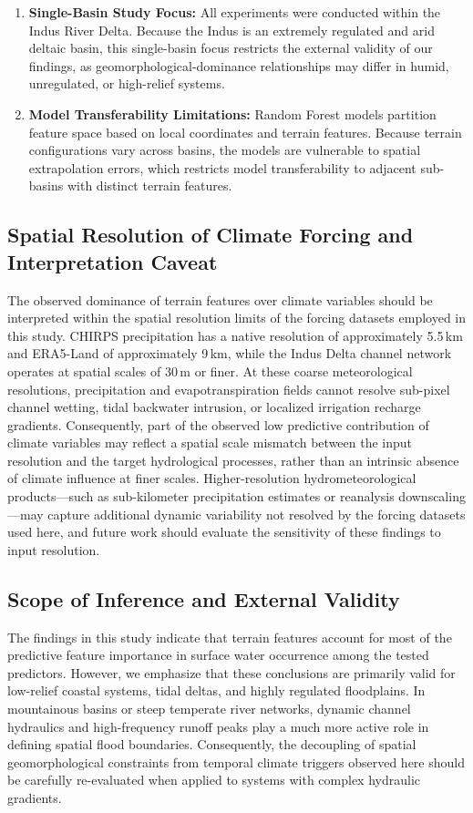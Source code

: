 \documentclass[12pt, a4paper]{article}
\begin{document}
\begin{enumerate}
    \item \textbf{Single-Basin Study Focus:} All experiments were conducted within the Indus River Delta. Because the Indus is an extremely regulated and arid deltaic basin, this single-basin focus restricts the external validity of our findings, as geomorphological-dominance relationships may differ in humid, unregulated, or high-relief systems.
    \item \textbf{Model Transferability Limitations:} Random Forest models partition feature space based on local coordinates and terrain features. Because terrain configurations vary across basins, the models are vulnerable to spatial extrapolation errors, which restricts model transferability to adjacent sub-basins with distinct terrain features.
\end{enumerate}

\subsection{Spatial Resolution of Climate Forcing and Interpretation Caveat}
The observed dominance of terrain features over climate variables should be interpreted within the spatial resolution limits of the forcing datasets employed in this study. CHIRPS precipitation has a native resolution of approximately 5.5\,km and ERA5-Land of approximately 9\,km, while the Indus Delta channel network operates at spatial scales of 30\,m or finer. At these coarse meteorological resolutions, precipitation and evapotranspiration fields cannot resolve sub-pixel channel wetting, tidal backwater intrusion, or localized irrigation recharge gradients. Consequently, part of the observed low predictive contribution of climate variables may reflect a spatial scale mismatch between the input resolution and the target hydrological processes, rather than an intrinsic absence of climate influence at finer scales. Higher-resolution hydrometeorological products---such as sub-kilometer precipitation estimates or reanalysis downscaling---may capture additional dynamic variability not resolved by the forcing datasets used here, and future work should evaluate the sensitivity of these findings to input resolution.

\subsection{Scope of Inference and External Validity}
The findings in this study indicate that terrain features account for most of the predictive feature importance in surface water occurrence among the tested predictors. However, we emphasize that these conclusions are primarily valid for low-relief coastal systems, tidal deltas, and highly regulated floodplains. In mountainous basins or steep temperate river networks, dynamic channel hydraulics and high-frequency runoff peaks play a much more active role in defining spatial flood boundaries. Consequently, the decoupling of spatial geomorphological constraints from temporal climate triggers observed here should be carefully re-evaluated when applied to systems with complex hydraulic gradients.
\end{document}
